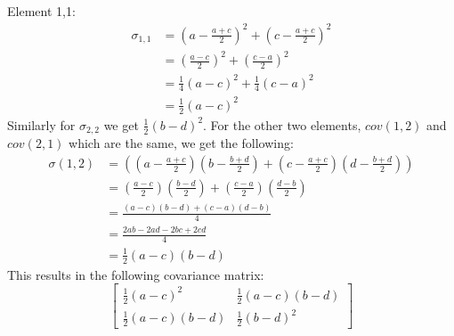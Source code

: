 \documentclass[10pt]{article}
\begin{document}
\subsection{}
Element 1,1:
\begin{align}
\sigma_{1,1} & = (a-\frac{a+c}{2})^2+(c-\frac{a+c}{2})^2 \\
& = (\frac{a-c}{2})^2 + (\frac{c-a}{2})^2 \\
& = \frac{1}{4}(a-c)^2 + \frac{1}{4}(c-a)^2 \\
& = \frac{1}{2}(a-c)^2
\end{align}
Similarly for $\sigma_{2,2}$ we get $\frac{1}{2}(b-d)^2$.
For the other two elements, $cov(1,2)$ and $cov(2,1)$ which are the same, we get the following:
\begin{align}
\sigma(1,2) & = ((a-\frac{a+c}{2})(b-\frac{b+d}{2})+(c-\frac{a+c}{2})(d-\frac{b+d}{2})) \\
& = (\frac{a-c}{2}) (\frac{b-d}{2}) + (\frac{c-a}{2}) (\frac{d-b}{2}) \\
& = \frac{(a-c)(b-d) + (c-a)(d-b)}{4} \\
& = \frac{2ab - 2ad - 2bc + 2cd}{4} \\
& = \frac{1}{2} (a-c)(b-d)
\end{align}
This results in the following covariance matrix:
\begin{equation}
    \begin{bmatrix}
      \frac{1}{2}(a-c)^2 & \frac{1}{2} (a-c)(b-d)\\
      \frac{1}{2} (a-c)(b-d) & \frac{1}{2}(b-d)^2
    \end{bmatrix}
\end{equation}
\end{document}
